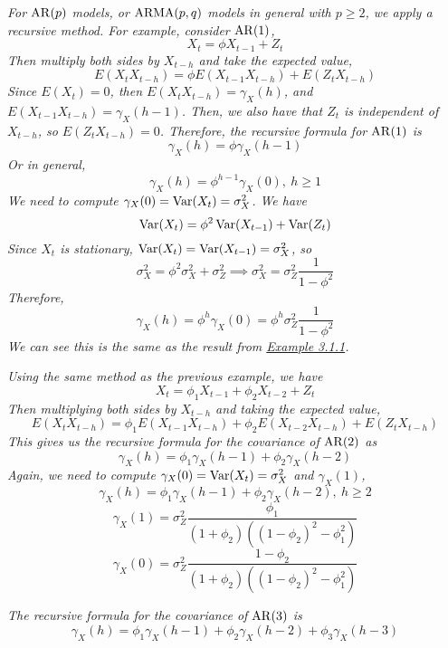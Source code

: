 \begin{example}[AR(1)]
    \emph{
        For $\operatorname{AR}(p)$ models, or $\operatorname{ARMA}(p,q)$ models in general with $p \geq 2$, we apply a recursive method. For example, consider $\operatorname{AR}(1)$, 
        \[X_t = \phi X_{t-1} + Z_t\]
        Then multiply both sides by $X_{t-h}$ and take the expected value, 
        \[E(X_tX_{t-h}) = \phi E(X_{t-1}X_{t-h}) + E(Z_tX_{t-h})\]
        Since $E(X_t) = 0$, then $E(X_tX_{t-h}) = \gamma_X(h)$, and $E(X_{t-1}X_{t-h}) = \gamma_X(h-1)$. Then, we also have that $Z_t$ is independent of $X_{t-h}$, so $E(Z_tX_{t-h}) = 0$. Therefore, the recursive formula for $\operatorname{AR}(1)$ is 
        \[\gamma_X(h) = \phi\gamma_X(h-1)\]
        Or in general, 
        \[\gamma_X(h) = \phi^{h-1}\gamma_X(0), \ h \geq 1\]
        We need to compute $\gamma_X(0) = \operatorname{Var}(X_t) = \sigma_X^2$. We have 
        \[\operatorname{Var}(X_t) = \phi^2\operatorname{Var}(X_{t-1}) + \operatorname{Var}(Z_t)\]
        Since $X_t$ is stationary, $\operatorname{Var}(X_t) = \operatorname{Var}(X_{t-1}) = \sigma_X^2$, so
        \[\sigma_X^2 = \phi^2\sigma_X^2 + \sigma_Z^2 \implies \sigma_X^2 = \sigma_Z^2 \frac{1}{1-\phi^2}\]
        Therefore, 
        \[\gamma_X(h) = \phi^h\gamma_X(0) = \phi^h \sigma_Z^2\frac{1}{1-\phi^2}\]
        We can see this is the same as the result from \hyperref[ex:ar1_acf]{Example 3.1.1}.
    }
\end{example}

\begin{example}[AR(2)]
    \emph{
        Using the same method as the previous example, we have
        \[X_t = \phi_1X_{t-1} + \phi_2X_{t-2} + Z_t\]
        Then multiplying both sides by $X_{t-h}$ and taking the expected value,
        \[E(X_tX_{t-h}) = \phi_1E(X_{t-1}X_{t-h}) + \phi_2E(X_{t-2}X_{t-h}) + E(Z_tX_{t-h})\]
        This gives us the recursive formula for the covariance of $\operatorname{AR}(2)$ as 
        \[\gamma_X(h) = \phi_1\gamma_X(h-1) + \phi_2\gamma_X(h-2)\]
        Again, we need to compute $\gamma_X(0) = \operatorname{Var}(X_t) = \sigma_X^2$ and $\gamma_X(1)$, 
        \[\gamma_X(h) = \phi_1\gamma_X(h-1) + \phi_2\gamma_X(h-2), \ h\geq 2\]
        \[\gamma_X(1) = \sigma_Z^2 \frac{\phi_1}{(1+\phi_2)((1-\phi_2)^2-\phi_1^2)}\]
        \[\gamma_X(0) = \sigma_Z^2 \frac{1-\phi_2}{(1+\phi_2)((1-\phi_2)^2-\phi_1^2)}\]
    }    
\end{example}

\begin{example}[AR(3)]
    \emph{The recursive formula for the covariance of $\operatorname{AR}(3)$ is}
    \[\gamma_X(h) = \phi_1\gamma_X(h-1) + \phi_2\gamma_X(h-2) + \phi_3\gamma_X(h-3)\]
\end{example}


